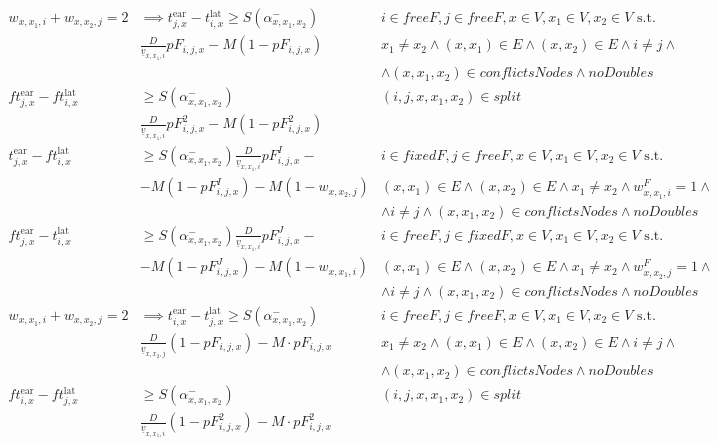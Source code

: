 \documentclass[../thesis.tex]{subfiles}
\begin{document}
{\begin{align}
w_{x,x_1,i} + w_{x,x_2,j} = 2&\implies t^\text{ear}_{j,x}- t^\text{lat}_{i,x}\geq S(\alpha^-_{x,x_1,x_2})&
i\in freeF,j\in freeF,x\in V, x_1\in V, x_2\in V\text { s.t. }
\nonumber\\
&\frac D {\underline v_{x,x_1,i}} pF_{i,j,x} -M(1-pF_{i,j,x})&
x_1\neq x_2 \land
(x,x_1)\in E\land (x,x_2)\in E \land i\neq j\land \nonumber\\&&\land  (x,x_1,x_2)\in conflictsNodes  \land  noDoubles\\
ft^\text{ear}_{j,x}- ft^\text{lat}_{i,x}&\geq S(\alpha^-_{x,x_1,x_2})&
(i,j,x,x_1,x_2)\in split
\nonumber\\
&\frac D {\underline v_{x,x_1,i}} pF^2_{i,j,x} -M(1-pF^2_{i,j,x})\\
t^\text{ear}_{j,x}- ft^\text{lat}_{i,x}&\geq S(\alpha^-_{x,x_1,x_2})\frac D {\underline v_{x,x_1,i}} pF^I_{i,j,x}-&
i \in fixedF, j\in freeF, x\in V,x_1\in V,x_2\in V\text { s.t. }
\nonumber\\
&  -M(1-pF^I_{i,j,x}) - M(1-w_{x,x_2,j})&
(x,x_1)\in E\land (x,x_2)\in E\land x_1\neq x_2\land w^F_{x,x_1,i}=1\land\nonumber\\
&&\land i\neq j \land (x,x_1,x_2)\in conflictsNodes\land noDoubles\\
ft^\text{ear}_{j,x}- t^\text{lat}_{i,x}&\geq S(\alpha^-_{x,x_1,x_2}) \frac D {\underline v_{x,x_1,i}} pF^J_{i,j,x}-&
i \in freeF, j\in fixedF, x\in V,x_1\in V,x_2\in V\text { s.t. }
\nonumber\\
 &-M (1-pF^J_{i,j,x}) - M(1-w_{x,x_1,i}) &
(x,x_1)\in E\land (x,x_2)\in E\land x_1\neq x_2\land w^F_{x,x_2,j}=1\land\nonumber\\
&&\land i\neq j\land (x,x_1,x_2)\in conflictsNodes\land noDoubles\\
%
%
w_{x,x_1,i} + w_{x,x_2,j} = 2&\implies t^\text{ear}_{i,x}- t^\text{lat}_{j,x}\geq S(\alpha^-_{x,x_1,x_2})&
i\in freeF,j\in freeF,x\in V, x_1\in V, x_2\in V\text { s.t. }
\nonumber\\
&\frac D {\underline v_{x,x_2,j}} (1-pF_{i,j,x}) -M\cdot pF_{i,j,x}&
x_1\neq x_2 \land
(x,x_1)\in E\land (x,x_2)\in E \land i\neq j\land \nonumber\\&&\land  (x,x_1,x_2)\in conflictsNodes  \land  noDoubles\\
ft^\text{ear}_{i,x}- ft^\text{lat}_{j,x}&\geq S(\alpha^-_{x,x_1,x_2})&
(i,j,x,x_1,x_2)\in split
\nonumber\\
&\frac D {\underline v_{x,x_1,i}} (1-pF^2_{i,j,x}) -M\cdot pF^2_{i,j,x}\\

\end{align}}
\end{document}
